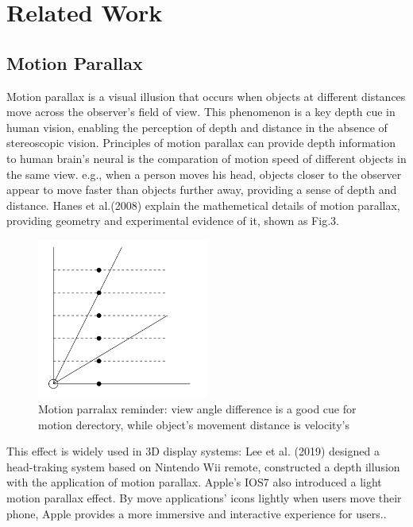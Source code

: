 
\section {Related Work}

\subsection {Motion Parallax}

Motion parallax is a visual illusion that occurs when objects at different distances move across the observer's field of view. This phenomenon is a key depth cue in human vision, enabling the perception of depth and distance in the absence of stereoscopic vision. Principles of motion parallax can provide depth information to human brain's neural is the comparation of motion speed of different objects in the same view. e.g., when a person moves his head, objects closer to the observer appear to move faster than objects further away, providing a sense of depth and distance. Hanes et al.(2008) explain the mathemetical details of motion parallax, providing geometry and experimental evidence of it\cite{Hanes2008}, shown as Fig.3.

\begin{figure}[htb]
    \centering
    \includegraphics[width=0.5\textwidth]{figures/Introduction/motion.png}
    \caption{Motion parralax reminder: view angle difference is a good cue for motion derectory, while object's movement distance is velocity's\cite{Hanes2008}}\label{F:test-a}
\end{figure}

This effect is widely used in 3D display systems: Lee et al. (2019) designed a head-traking system based on Nintendo Wii remote, constructed a depth illusion with the application of motion parallax\cite{Lee}. Apple's IOS7 also introduced a light motion parallax effect. By move applications' icons lightly when users move their phone, Apple provides a more immersive and interactive experience for users.\cite{Apple2014}.
